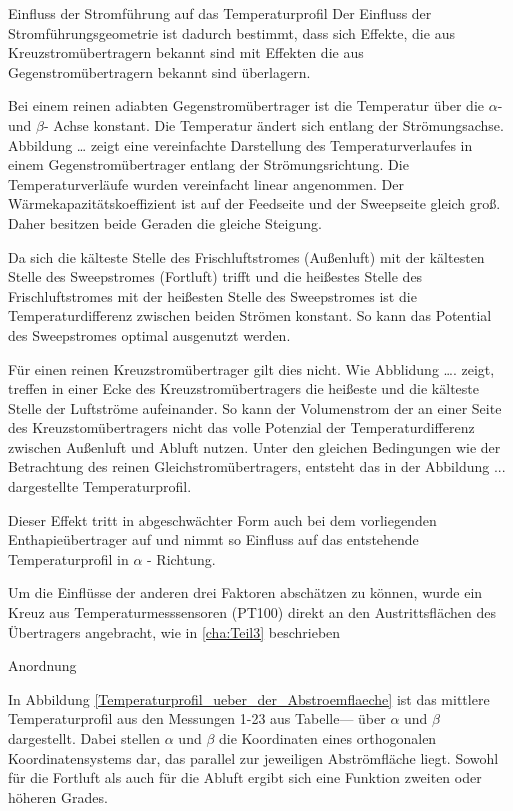 Einfluss der Stromführung auf das Temperaturprofil
Der Einfluss der Stromführungsgeometrie ist dadurch bestimmt, dass sich Effekte, die aus Kreuzstromübertragern bekannt sind mit Effekten die aus Gegenstromübertragern bekannt sind überlagern.

Bei einem reinen adiabten Gegenstromübertrager ist die Temperatur über die $\alpha$- und $\beta$- Achse konstant. Die Temperatur ändert sich entlang der Strömungsachse. Abbildung … zeigt eine vereinfachte Darstellung des Temperaturverlaufes in einem Gegenstromübertrager entlang der Strömungsrichtung. Die Temperaturverläufe wurden vereinfacht linear angenommen. Der Wärmekapazitätskoeffizient ist auf der Feedseite und der Sweepseite gleich groß. Daher besitzen beide Geraden die gleiche Steigung.


Da sich die kälteste Stelle des Frischluftstromes (Außenluft) mit der kältesten Stelle des Sweepstromes (Fortluft) trifft und die heißestes Stelle des Frischluftstromes mit der heißesten Stelle des Sweepstromes ist die Temperaturdifferenz zwischen beiden Strömen konstant. So kann das Potential des Sweepstromes optimal ausgenutzt werden. 

Für einen reinen Kreuzstromübertrager gilt dies nicht. Wie Abblidung …. zeigt, treffen in einer Ecke des Kreuzstromübertragers die heißeste und die kälteste Stelle der Luftströme aufeinander. So kann der Volumenstrom der an einer Seite des Kreuzstomübertragers nicht das volle Potenzial der Temperaturdifferenz zwischen Außenluft und Abluft nutzen. Unter den gleichen Bedingungen wie der Betrachtung des reinen Gleichstromübertragers, entsteht das in der Abbildung ... dargestellte Temperaturprofil. 


Dieser Effekt tritt in abgeschwächter Form auch bei dem vorliegenden Enthapieübertrager auf und nimmt so Einfluss auf das entstehende Temperaturprofil in $\alpha$ - Richtung.




Um die Einflüsse der anderen drei Faktoren abschätzen zu können, wurde ein Kreuz aus Temperaturmesssensoren (PT100) direkt an den Austrittsflächen des Übertragers angebracht, wie in \ref{cha:Teil3} beschrieben


Anordnung


In Abbildung \ref{Temperaturprofil_ueber_der_Abstroemflaeche} ist das mittlere Temperaturprofil aus den Messungen 1-23 aus Tabelle--- über $\alpha$ und $\beta$ dargestellt. Dabei stellen $\alpha$ und $\beta$ die Koordinaten eines orthogonalen Koordinatensystems dar, das parallel zur jeweiligen Abströmfläche liegt. Sowohl für die Fortluft als auch für die Abluft ergibt sich eine Funktion zweiten oder höheren Grades.

